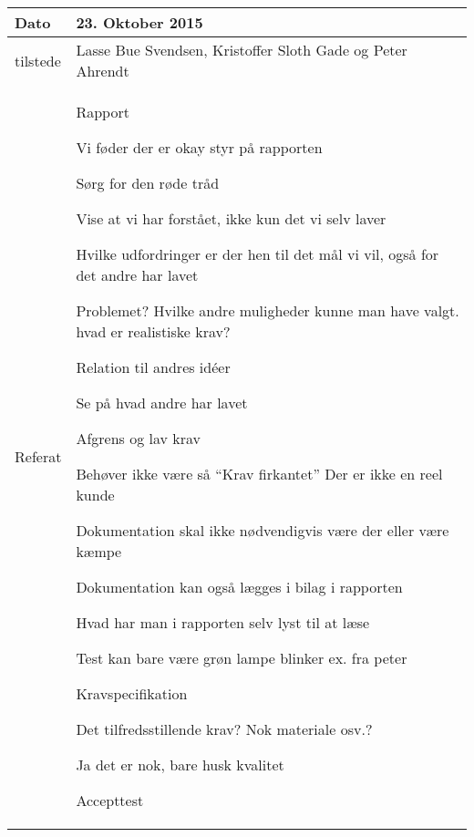 \begin{center}
	\begin{tabular}{| l | p{10cm} |}
		\hline
		Dato		& 23. Oktober 2015\\ \hline
		tilstede 	& Lasse Bue Svendsen, Kristoffer Sloth Gade og Peter Ahrendt\\ \hline
		Referat		& \vspace{-5mm}\begin{myEnumerate}
			\item Rapport
			\begin{myItemize}				
				\item Vi føder der er okay styr på rapporten
				\item Sørg for den røde tråd
				\item Vise at vi har forstået, ikke  kun det vi selv laver
				\item Hvilke udfordringer er der hen til det mål vi vil, også for det andre har lavet
				\item Problemet? Hvilke andre muligheder kunne man have valgt. hvad er realistiske krav?
				\item Relation til andres idéer
				\item Se på hvad andre har lavet
				\begin{myItemize}
					\item Afgrens og lav krav
				\end{myItemize}
				\item Behøver ikke være så “Krav firkantet” Der er ikke en reel kunde
				\item Dokumentation skal ikke nødvendigvis være der eller være kæmpe
				\item Dokumentation kan også lægges i bilag i rapporten
				\item Hvad har man i rapporten selv lyst til at læse
				\item Test kan bare være grøn lampe blinker ex. fra peter		
			\end{myItemize}
			\item Kravspecifikation
			\begin{myItemize}
				\item Det tilfredsstillende krav? Nok materiale osv.?
				\begin{myItemize}
					\item Ja det er nok, bare husk kvalitet
				\end{myItemize}
			\end{myItemize}
			\item Accepttest
			\begin{myItemize}

\end{myItemize}
\end{myEnumerate}
\end{tabular}
\end{center}
